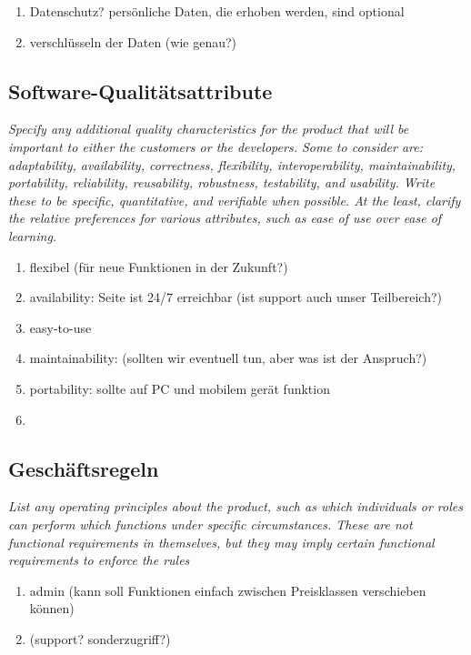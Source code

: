 \begin{enumerate}
    \item Datenschutz? persönliche Daten, die erhoben werden, sind optional
    \item verschlüsseln der Daten (wie genau?)
\end{enumerate}


\subsection{Software-Qualitätsattribute}
\textit{Specify any additional quality characteristics for the product that will be important to either the customers or
the developers.
Some to consider are: adaptability, availability, correctness, flexibility, 
interoperability, maintainability, portability, reliability, reusability, 
robustness, testability, and usability. Write these to be specific, quantitative, 
and verifiable when possible.
At the least, clarify the relative preferences for various attributes, 
such as ease of use over ease of learning.}

\begin{enumerate}
    \item flexibel (für neue Funktionen in der Zukunft?)
    \item availability: Seite ist 24/7 erreichbar (ist support auch unser Teilbereich?)
    \item easy-to-use
    \item maintainability: (sollten wir eventuell tun, aber was ist der Anspruch?)
    \item portability: sollte auf PC und mobilem gerät funktion
    \item
\end{enumerate}

\subsection{Geschäftsregeln}
\textit{List any operating principles about the product, 
such as which individuals or roles can perform which functions under specific circumstances. 
These are not functional requirements in themselves, 
but they may imply certain functional requirements to enforce the rules}

\begin{enumerate}
    \item admin (kann soll Funktionen einfach zwischen Preisklassen verschieben können)
    \item (support? sonderzugriff?)
\end{enumerate}
